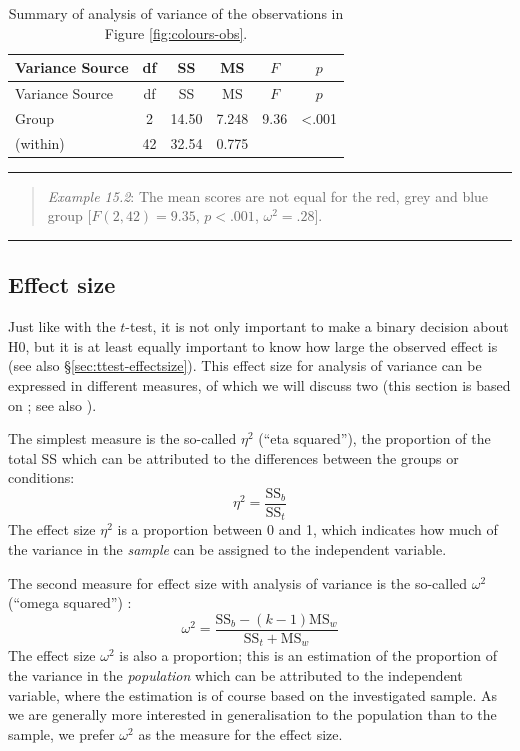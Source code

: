 \documentclass[
]{book}
\begin{document}
\begin{longtable}[]{@{}lccccc@{}}
\caption{\label{tab:colours-anova} Summary of analysis of variance of the observations in Figure \ref{fig:colours-obs}.}\tabularnewline
\toprule\noalign{}
Variance Source & df & SS & MS & \(F\) & \(p\) \\
\midrule\noalign{}
\endfirsthead
\toprule\noalign{}
Variance Source & df & SS & MS & \(F\) & \(p\) \\
\midrule\noalign{}
\endhead
\bottomrule\noalign{}
\endlastfoot
Group & 2 & 14.50 & 7.248 & 9.36 & \textless.001 \\
(within) & 42 & 32.54 & 0.775 & & \\
\end{longtable}

\begin{center}\rule{0.5\linewidth}{0.5pt}\end{center}

\begin{quote}
\emph{Example 15.2}:
The mean scores are not equal for the red, grey and blue group
\([F(2,42) = 9.35\), \(p < .001\), \(\omega^2 = .28]\).
\end{quote}

\begin{center}\rule{0.5\linewidth}{0.5pt}\end{center}

\subsection{Effect size}\label{sec:anova-oneway-effectsize}

Just like with the \(t\)-test, it is not only important to make a binary decision
about H0, but it is at least equally important to know how large
the observed effect is (see also
§\ref{sec:ttest-effectsize}). This effect size for
analysis of variance can be expressed in different measures, of which we will
discuss two (this section is based on \citet{KL00}; see also \citet{Olej03}).

The simplest measure is the so-called \(\eta^2\) (``eta
squared''), the proportion of the total SS which can be attributed to the
differences between the groups or conditions: \[\label{eq:etasq}
    \eta^2 = \frac{ \textrm{SS}_b } { \textrm{SS}_t }\] The effect size
\(\eta^2\) is a proportion between 0 and 1, which indicates how much of the
variance in the \emph{sample} can be assigned to the independent
variable.

The second measure for effect size with analysis of variance is the so-called
\(\omega^2\) (``omega squared'') \citep[p.296]{MD04}:
\begin{equation}
  \label{eq:omegasq}
    \omega^2 = \frac{ \textrm{SS}_b - (k-1) \textrm{MS}_w} { \textrm{SS}_t + \textrm{MS}_w }
\end{equation}
The effect size \(\omega^2\) is also a proportion; this is an estimation
of the proportion of the variance in the \emph{population} which can be attributed
to the independent variable, where the estimation is of course based
on the investigated sample. As we are generally more interested in
generalisation to the population than to the sample, we prefer \(\omega^2\)
as the measure for the effect size.
\end{document}
